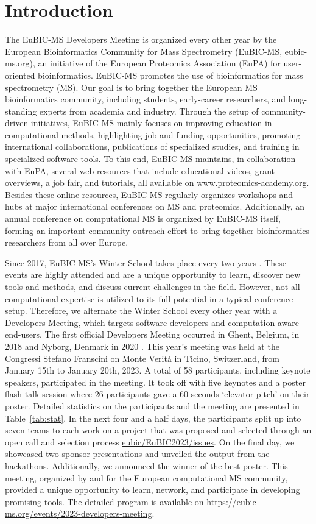 \section{Introduction}
The EuBIC-MS Developers Meeting is organized every other year by the European Bioinformatics Community for Mass Spectrometry (EuBIC-MS, eubic-ms.org), an initiative of the European Proteomics Association (EuPA) for user-oriented bioinformatics. EuBIC-MS promotes the use of bioinformatics for mass spectrometry (MS). Our goal is to bring together the European MS bioinformatics community, including students, early-career researchers, and long-standing experts from academia and industry. Through the setup of community-driven initiatives, EuBIC-MS mainly focuses on improving education in computational methods, highlighting job and funding opportunities, promoting international collaborations, publications of specialized studies, and training in specialized software tools. To this end, EuBIC-MS maintains, in collaboration with EuPA, several web resources that include educational videos, grant overviews, a job fair, and tutorials, all available on www.proteomics-academy.org. Besides these online resources, EuBIC-MS regularly organizes workshops and hubs at major international conferences on MS and proteomics. Additionally, an annual conference on computational MS is organized by EuBIC-MS itself, forming an important community outreach effort to bring together bioinformatics researchers from all over Europe.

Since 2017, EuBIC-MS's Winter School takes place every two years \citep{pmid28385664}. These events are highly attended and are a unique opportunity to learn, discover new tools and methods, and discuss current challenges in the field. However, not all computational expertise is utilized to its full potential in a typical conference setup. Therefore, we alternate the Winter School every other year with a Developers Meeting, which targets software developers and computation-aware end-users. The first official Developers Meeting occurred in Ghent, Belgium, in 2018 \citep{pmid29864591} and Nyborg, Denmark in 2020 \citep{EuBIC-MS2020}. This year's meeting was held at the Congressi Stefano Franscini on Monte Verità in Ticino, Switzerland, from January 15th to January 20th, 2023. A total of 58 participants, including keynote speakers, participated in the meeting.
It took off with five keynotes and a poster flash talk session where 26 participants gave a 60-seconds `elevator pitch' on their poster. Detailed statistics on the participants and the meeting are presented in Table~\ref{tab:stat}. In the next four and a half days, the participants split up into seven teams to each work on a project that was proposed and selected through an open call and selection process \href{https://github.com/eubic/EuBIC2023/issues}{eubic/EuBIC2023/issues}. On the final day, we showcased two sponsor presentations and unveiled the output from the hackathons. Additionally, we announced the winner of the best poster. This meeting, organized by and for the European computational MS community, provided a unique opportunity to learn, network, and participate in developing promising tools. The detailed program is available on \url{https://eubic-ms.org/events/2023-developers-meeting}.

